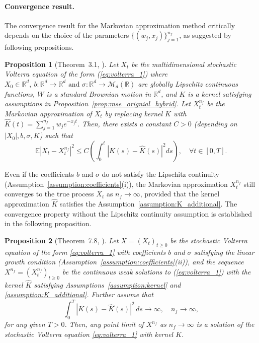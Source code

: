 \documentclass[11pt]{article}%
\newtheorem{proposition}{Proposition}
\theoremstyle{definition}
\begin{document}
\paragraph{Convergence result.} The convergence result for the Markovian approximation method critically depends on the choice of the parameters \(\{(w_j,x_j)\}_{j=1}^{n_f}\), as suggested by following propositions.
\begin{proposition}[Theorem~3.1, \cite{AlfonsiKeabier2023}]\label{prop:markov_approx_convergence}
    Let \(X_t\) be the multidimensional stochastic Volterra equation of the form (\ref{eq:volterra_1}) where \(X_0 \in \mathbb{R}^d,\ b: \mathbb{R}^d \to \mathbb{R}^d \text{ and } \sigma: \mathbb{R}^d \to \mathcal{M}_d(\mathbb{R})\) are globally Lipschitz continuous functions, \(W\) is a standard Brownian motion in \(\mathbb{R}^d\), and \(K\) is a kernel satisfying assumptions in Proposition~\ref{prop:mse_orignial_hybrid}. Let \(X_t^{n_f}\) be the Markovian approximation of \(X_t\) by replacing kernel \(K\) with \(\widehat{K}(t) = \sum_{j=1}^{n_f} w_j e^{-x_j t}\). Then, there exists a constant \(C>0\) (depending on \(|X_0|,b,\sigma,K\)) such that
    \begin{equation}
        \mathbb{E}\left|X_t - X_t^{n_f}\right|^2 \le C \left( \int_{0}^{t} |K(s) - \widehat{K}(s)|^2 ds\right),\quad \forall t\in[0,T].
    \end{equation}
\end{proposition}

Even if the coefficients \(b\) and \(\sigma\) do not satisfy the Lipschitz continuity (Assumption~\ref{assumption:coefficients}(i)), the Markovian approximation \(X_t^{n_f}\) still converges to the true process \(X_t\) as \(n_f\to\infty\), provided that the kernel approximation \(\widehat{K}\) satisfies the Assumption~\ref{assumption:K_additional}. The convergence property without the Lipschitz continuity assumption is established in the following proposition.

\begin{proposition}[Theorem~7.8, \cite{abijaber2018}]\label{prop:markov_approx_convergence_2}
   Let \(X=(X_t)_{t\ge 0}\) be the stochastic Volterra equation of the form \eqref{eq:volterra_1} with coefficients \(b\) and \(\sigma\) satisfying the linear growth condition (Assumption~\ref{assumption:coefficients}(ii)), and the sequence \(X^{n_f}=(X_t^{n_f})_{t\ge 0}\) be the continuous weak solutions to (\ref{eq:volterra_1}) with the kernel \(\widehat{K}\) satisfying Assumptions~\ref{assumption:kernel} and \ref{assumption:K_additional}. Further assume that 
   \[
   \int_{0}^{T} |K(s) - \widehat{K}(s)|^2\,ds \to \infty,\quad n_f\to\infty,
   \]
   for any given \(T > 0\). Then, any point limit of \(X^{n_f}\) as \(n_f\to \infty\) is a solution of the stochastic Volterra equation \eqref{eq:volterra_1} with kernel \(K\).

\end{proposition}
\end{document}
